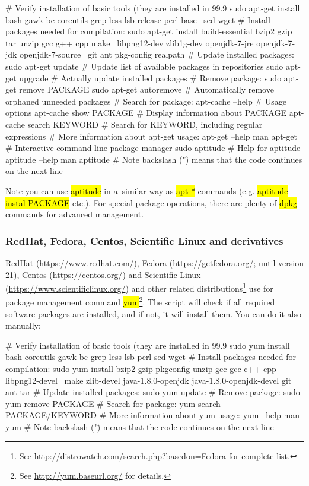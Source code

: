 \documentclass[a4paper, 11pt, twoside]{article}
\renewcommand{\texttt}[1]{\hl{\ttfamily #1}}
\begin{document}
\begin{bashcode}
  # Verify installation of basic tools (they are installed in 99.9%
  sudo apt-get install bash gawk bc coreutils grep less lsb-release perl-base \
    sed wget
  # Install packages needed for compilation:
  sudo apt-get install build-essential bzip2 gzip tar unzip gcc g++ cpp make \
    libpng12-dev zlib1g-dev openjdk-7-jre openjdk-7-jdk openjdk-7-source \
    git ant pkg-config realpath
  # Update installed packages:
  sudo apt-get update # Update list of available packages in repositories
  sudo apt-get upgrade # Actually update installed packages
  # Remove package:
  sudo apt-get remove PACKAGE
  sudo apt-get autoremove # Automatically remove orphaned unneeded packages
  # Search for package:
  apt-cache --help # Usage options
  apt-cache show PACKAGE # Display information about PACKAGE
  apt-cache search KEYWORD # Search for KEYWORD, including regular expressions
  # More information about apt-get usage:
  apt-get --help
  man apt-get
  # Interactive command-line package manager
  sudo aptitude
  # Help for aptitude
  aptitude --help
  man aptitude
  # Note backslash ("\") means that the code continues on the next line
\end{bashcode}

Note you can use \texttt{aptitude} in a~similar way as \texttt{apt-*} commands (e.g. \texttt{aptitude instal PACKAGE} etc.). For special package operations, there are plenty of \texttt{dpkg} commands for advanced management.

\subsubsection{RedHat, Fedora, Centos, Scientific Linux and derivatives}

RedHat (\url{https://www.redhat.com/}), Fedora (\url{https://getfedora.org/}; until version 21), Centos (\url{https://centos.org/}) and Scientific Linux (\url{https://www.scientificlinux.org/}) and other related distributions\footnote{See \url{http://distrowatch.com/search.php?basedon=Fedora} for complete list.} use for package management command \texttt{yum}\footnote{See \url{http://yum.baseurl.org/} for details.}. The script will check if all required software packages are installed, and if not, it will install them. You can do it also manually:

\begin{bashcode}
  # Verify installation of basic tools (they are installed in 99.9%
  sudo yum install bash coreutils gawk bc grep less lsb perl sed wget
  # Install packages needed for compilation:
  sudo yum install bzip2 gzip pkgconfig unzip gcc gcc-c++ cpp libpng12-devel \
    make zlib-devel java-1.8.0-openjdk java-1.8.0-openjdk-devel git ant tar
  # Update installed packages:
  sudo yum update
  # Remove package:
  sudo yum remove PACKAGE
  # Search for package:
  yum search PACKAGE/KEYWORD
  # More information about yum usage:
  yum --help
  man yum
  # Note backslash ("\") means that the code continues on the next line
\end{bashcode}
\end{document}
